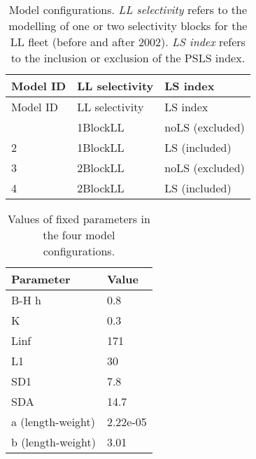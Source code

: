 \documentclass[
]{scrartcl}
\begin{document}
\begin{longtable}[]{@{}lll@{}}
\caption{Model configurations. \emph{LL selectivity} refers to the
modelling of one or two selectivity blocks for the LL fleet (before and
after 2002). \emph{LS index} refers to the inclusion or exclusion of the
PSLS index.}\label{tbl-mod-config}\tabularnewline
\toprule\noalign{}
Model ID & LL selectivity & LS index \\
\midrule\noalign{}
\endfirsthead
\toprule\noalign{}
Model ID & LL selectivity & LS index \\
\midrule\noalign{}
\endhead
\bottomrule\noalign{}
\endlastfoot
1 & 1BlockLL & noLS (excluded) \\
2 & 1BlockLL & LS (included) \\
3 & 2BlockLL & noLS (excluded) \\
4 & 2BlockLL & LS (included) \\
\end{longtable}

\begin{longtable}[]{@{}ll@{}}

\caption{\label{tbl-par-fix}Values of fixed parameters in the four model
configurations.}

\tabularnewline

\toprule\noalign{}
Parameter & Value \\
\midrule\noalign{}
\endhead
\bottomrule\noalign{}
\endlastfoot
B-H h & 0.8 \\
K & 0.3 \\
Linf & 171 \\
L1 & 30 \\
SD1 & 7.8 \\
SDA & 14.7 \\
a (length-weight) & 2.22e-05 \\
b (length-weight) & 3.01 \\

\end{longtable}

\newpage{}
\end{document}
